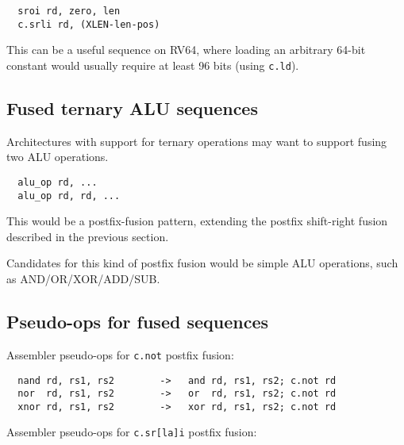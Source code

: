 \begin{minipage}{\linewidth}
\begin{verbatim}
  sroi rd, zero, len
  c.srli rd, (XLEN-len-pos)
\end{verbatim}
\end{minipage}

This can be a useful sequence on RV64, where loading an arbitrary 64-bit constant would usually
require at least 96 bits (using \texttt{c.ld}).


\subsection{Fused ternary ALU sequences}

Architectures with support for ternary operations may want to support fusing two ALU operations.

\begin{minipage}{\linewidth}
\begin{verbatim}
  alu_op rd, ...
  alu_op rd, rd, ...
\end{verbatim}
\end{minipage}

This would be a postfix-fusion pattern, extending the postfix shift-right
fusion described in the previous section.

Candidates for this kind of postfix fusion would be simple ALU operations, such
as AND/OR/XOR/ADD/SUB.


\subsection{Pseudo-ops for fused sequences}

Assembler pseudo-ops for {\tt c.not} postfix fusion:

\begin{minipage}{\linewidth}
\begin{verbatim}
  nand rd, rs1, rs2        ->   and rd, rs1, rs2; c.not rd
  nor  rd, rs1, rs2        ->   or  rd, rs1, rs2; c.not rd
  xnor rd, rs1, rs2        ->   xor rd, rs1, rs2; c.not rd
\end{verbatim}
\end{minipage}

Assembler pseudo-ops for {\tt c.sr[la]i} postfix fusion:

